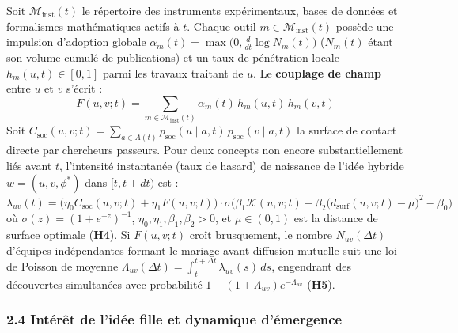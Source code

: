 \documentclass[a4paper,11pt]{article}
\begin{document}
Soit \(\mathcal{M}_{\text{inst}}(t)\) le répertoire des instruments
expérimentaux, bases de données et formalismes mathématiques actifs à
\(t\). Chaque outil \(m \in \mathcal{M}_{\text{inst}}(t)\) possède une
impulsion d'adoption globale
\(\alpha_m(t) = \max\!\big(0, \frac{d}{dt}\log N_m(t)\big)\) (\(N_m(t)\)
étant son volume cumulé de publications) et un taux de pénétration
locale \(h_m(u, t) \in [0,1]\) parmi les travaux traitant de \(u\). Le
\textbf{couplage de champ} entre \(u\) et \(v\) s'écrit :
\[F(u, v; t) = \sum_{m \in \mathcal{M}_{\text{inst}}(t)} \alpha_m(t)\, h_m(u, t)\, h_m(v, t)\]
Soit
\(C_{\text{soc}}(u, v; t) = \sum_{a \in A(t)} p_{\text{soc}}(u \mid a, t)\,p_{\text{soc}}(v \mid a, t)\)
la surface de contact directe par chercheurs passeurs. Pour deux
concepts non encore substantiellement liés avant \(t\), l'intensité
instantanée (taux de hasard) de naissance de l'idée hybride
\(w = (u, v, \phi^*)\) dans \([t, t+dt)\) est :
\[\lambda_{uv}(t) = \big(\eta_0 C_{\text{soc}}(u, v; t) + \eta_1 F(u, v; t)\big) \cdot \sigma\!\Big(\beta_1 \mathcal{K}(u, v; t) - \beta_2 \big(d_{\text{surf}}(u, v; t) - \mu\big)^2 - \beta_0\Big)\]
où \(\sigma(z) = (1+e^{-z})^{-1}\),
\(\eta_0, \eta_1, \beta_1, \beta_2 > 0\), et \(\mu \in (0,1)\) est la
distance de surface optimale (\textbf{H4}). Si \(F(u,v;t)\) croît
brusquement, le nombre \(N_{uv}(\Delta t)\) d'équipes indépendantes
formant le mariage avant diffusion mutuelle suit une loi de Poisson de
moyenne
\(\Lambda_{uv}(\Delta t) = \int_t^{t+\Delta t} \lambda_{uv}(s)\,ds\),
engendrant des découvertes simultanées avec probabilité
\(1 - (1 + \Lambda_{uv})e^{-\Lambda_{uv}}\) (\textbf{H5}).

\subsubsection*{2.4 Intérêt de l'idée fille et dynamique d'émergence}
\end{document}
